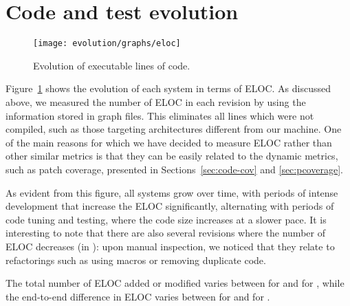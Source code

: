 \section{Code and test evolution}
\label{sec:code-test-evol}

\begin{figure}[t]
%
\texttt{[image: evolution/graphs/eloc]}
\caption{Evolution of executable lines of code.}
\label{fig:codebase-evol}
\end{figure}


Figure~\ref{fig:codebase-evol} shows the evolution of each system in
terms of ELOC.  As discussed above, we measured the number of ELOC in
each revision by using the information stored in \gcov graph files.
This eliminates all lines which were not compiled, such as those
targeting architectures different from our machine.  One of the main
reasons for which we have decided to measure ELOC rather than other
similar metrics is that they can be easily related to the dynamic
metrics, such as patch coverage, presented in
Sections~\ref{sec:code-cov} and \ref{sec:pcoverage}.


As evident from this figure, all \numSystems systems grow over time,
with periods of intense development that increase the ELOC
significantly, alternating with periods of code tuning and testing,
where the code size increases at a slower pace.  It is interesting to
note that there are also several revisions where the number of ELOC
decreases (\eg in \zeromq): upon manual inspection, we noticed that
they relate to refactorings such as using macros or removing duplicate
code.


The total number of ELOC added or modified varies
between \redisPatchTotal for \redis and \lighttpdtwoPatchTotal
for \lighttpdtwo, while the end-to-end difference in ELOC varies
between \beanstalkdDeltaSize for \beanstalkd and \lighttpdtwoDeltaSize
for \lighttpdtwo.


